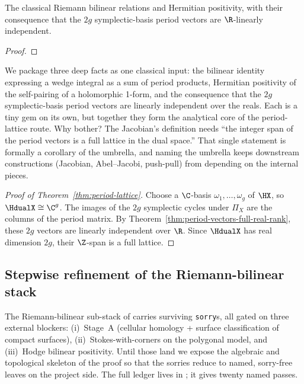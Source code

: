 \begin{theorem}
\label{input:riemann-bilinear}
\leanok
The classical Riemann bilinear relations and Hermitian positivity, with
their consequence that the \(2g\) symplectic-basis period vectors are
\(\R\)-linearly independent.
\end{theorem}
\begin{proof}\leanok\end{proof}

\begin{layman}
We package three deep facts as one classical input: the bilinear
identity expressing a wedge integral as a sum of period products,
Hermitian positivity of the self-pairing of a holomorphic 1-form, and
the consequence that the \(2g\) symplectic-basis period vectors are
linearly independent over the reals. Each is a tiny gem on its own,
but together they form the analytical core of the period-lattice
route. Why bother? The Jacobian's definition needs ``the integer span
of the period vectors is a full lattice in the dual space.'' That
single statement is formally a corollary of the umbrella, and naming
the umbrella keeps downstream constructions (Jacobian, Abel--Jacobi,
push-pull) from depending on the internal pieces.
\end{layman}

\begin{proof}[Proof of Theorem~\ref{thm:period-lattice}]\leanok
Choose a \(\C\)-basis \(\omega_1,\dots,\omega_g\) of \(\HX\), so
\(\HdualX\cong\C^g\). The images of the \(2g\) symplectic cycles under
\(\Pi_X\) are the columns of the period matrix.
By Theorem~\ref{thm:period-vectors-full-real-rank}, these \(2g\) vectors
are linearly independent over \(\R\). Since \(\HdualX\) has real
dimension \(2g\), their \(\Z\)-span is a full lattice.
\end{proof}

\subsection{Stepwise refinement of the Riemann-bilinear stack}
\label{subsec:riemann-bilinear-refinement}

The Riemann-bilinear sub-stack of 
carries surviving \texttt{sorry}s, all gated on three external blockers:
(i)~Stage~A (cellular homology + surface classification of compact surfaces),
(ii)~Stokes-with-corners on the polygonal model, and (iii)~Hodge bilinear
positivity. Until those land we expose the algebraic and topological skeleton
of the proof so that the sorries reduce to named, sorry-free leaves on the
project side. The full ledger lives in
; it gives twenty
named passes.


